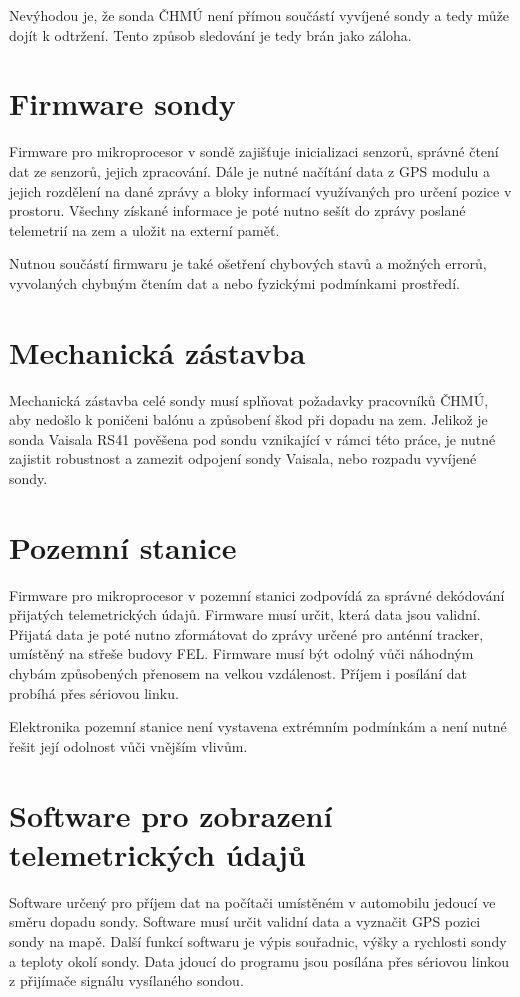\documentclass[twoside]{ctuthesis}
\theoremstyle{plain}
\theoremstyle{definition}
\theoremstyle{note}
\begin{document}
				Nevýhodou je, že sonda ČHMÚ není přímou součástí vyvíjené sondy a tedy může dojít k odtržení. Tento způsob sledování je tedy brán jako záloha.


			
	\section{Firmware sondy}
	Firmware pro mikroprocesor v sondě zajišťuje inicializaci senzorů, správné čtení dat ze senzorů, jejich zpracování. Dále je nutné načítání data z GPS modulu a jejich rozdělení na dané zprávy a bloky informací využívaných pro určení pozice v prostoru. Všechny získané informace je poté nutno sešít do zprávy poslané telemetrií na zem a uložit na externí paměť. 

	Nutnou součástí firmwaru je také ošetření chybových stavů a možných errorů, vyvolaných chybným čtením dat a nebo fyzickými podmínkami prostředí.

	\section{Mechanická zástavba}
	Mechanická zástavba celé sondy musí splňovat požadavky pracovníků ČHMÚ, aby nedošlo k poničeni balónu a způsobení škod při dopadu na zem. Jelikož je sonda Vaisala RS41 pověšena pod sondu vznikající v rámci této práce, je nutné zajistit robustnost a zamezit odpojení sondy Vaisala, nebo rozpadu vyvíjené sondy.



	\section{Pozemní stanice}
	\label{sec:navrh:pozemni_stanice}
	Firmware pro mikroprocesor v pozemní stanici zodpovídá za správné dekódování přijatých telemetrických údajů. Firmware musí určit, která data jsou validní. Přijatá data je poté nutno zformátovat do zprávy určené pro anténní tracker, umístěný na střeše budovy FEL. Firmware musí být odolný vůči náhodným chybám způsobených přenosem na velkou vzdálenost. Příjem i posílání dat probíhá přes sériovou linku. 

	Elektronika pozemní stanice není vystavena extrémním podmínkám a není nutné řešit její odolnost vůči vnějším vlivům. 
	

	\section{Software pro zobrazení telemetrických údajů}
	Software určený pro příjem dat na počítači umístěném v automobilu jedoucí ve směru dopadu sondy. Software musí určit validní data a vyznačit GPS pozici sondy na mapě. Další funkcí softwaru je výpis souřadnic, výšky a rychlosti sondy a teploty okolí sondy. Data jdoucí do programu jsou posílána přes sériovou linkou z přijímače signálu vysílaného sondou. 
\end{document}
